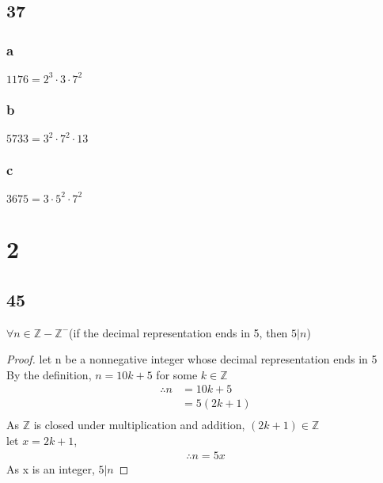 \documentclass{article}
\begin{document}
\subsection{37}
\subsubsection{a}
$1176 = 2^3 \cdot 3 \cdot 7^2$
\subsubsection{b}
$5733 = 3^2 \cdot 7^2 \cdot 13$
\subsubsection{c}
$3675 = 3 \cdot 5^2 \cdot 7^2$

\section{2}
\subsection{45}
$\forall n \in \mathbb{Z} - \mathbb{Z^-}$(if the decimal representation ends in 5, then $5|n$)
\begin{proof}
    let n be a nonnegative integer whose decimal representation ends in 5\\
    By the definition, $n = 10k + 5$ for some $k \in \mathbb{Z}$\\
    \begin{align*}
        \therefore
        n &= 10k + 5\\
          &= 5(2k + 1) \tag{By definition}\\
    \end{align*}
    As $\mathbb{Z}$ is closed under multiplication and addition, $(2k+1) \in \mathbb{Z}$\\
    let $x = 2k+1$, \\
    \begin{align*}
        \therefore
        n = 5x \tag{By substitution} 
    \end{align*}
    As x is an integer, $5|n$
\end{proof}
\end{document}
